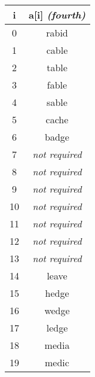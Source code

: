 \documentclass{article}
\begin{document}
\begin{tabular}{c | c}
i & a[i] \textit{(fourth)}\\ \hline
0 & rabid\\ \hline
1 & cable\\ \hline
2 & table\\ \hline
3 & fable\\ \hline
4 & sable\\ \hline
5 & cache\\ \hline
6 & badge\\ \hline
7 & \textit{\tiny not required}\\ \hline
8 & \textit{\tiny not required}\\ \hline
9 & \textit{\tiny not required}\\ \hline
10 & \textit{\tiny not required}\\ \hline
11 & \textit{\tiny not required}\\ \hline
12 & \textit{\tiny not required}\\ \hline
13 & \textit{\tiny not required}\\ \hline
14 & leave\\ \hline
15 & hedge\\ \hline
16 & wedge\\ \hline
17 & ledge\\ \hline
18 & media\\ \hline
19 & medic
\end{tabular}
\end{document}
